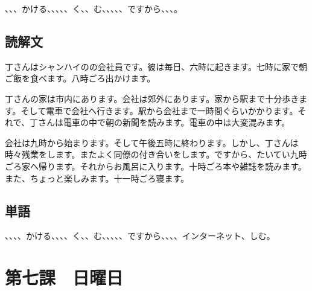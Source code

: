 \documentclass[a5j]{ltjtarticle}
\begin{document}
\begin{onehalfspace}
  、、、かける、、、、、く、、む、、、、、ですから、、、。
\end{onehalfspace}

\subsection*{読解文}

\noindent\hfil{}

丁さんはシャンハイのの会社員です。彼は毎日、六時に起きます。七時に家で朝ご飯を食べます。八時ごろ出かけます。

丁さんの家は市内にあります。会社は郊外にあります。家から駅まで十分歩きます。そして電車で会社へ行きます。駅から会社まで一時間ぐらいかかります。それで、丁さんは電車の中で朝の新聞を読みます。電車の中は大変混みます。

会社は九時から始まります。そして午後五時に終わります。しかし、丁さんは時々残業をします。またよく同僚の付き合いをします。ですから、たいてい九時ごろ家へ帰ります。それからお風呂に入ります。十時ごろ本や雑誌を読みます。また、ちょっと楽しみます。十一時ごろ寝ます。

\subsection*{単語}

\begin{onehalfspace}
  、、、、かける、、、、く、、む、、、、、ですから、、、、インターネット、しむ。
\end{onehalfspace}

\section*{第七課　日曜日}
\end{document}
